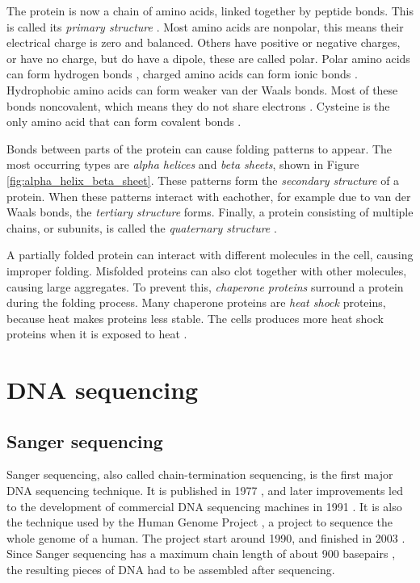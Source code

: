 \documentclass[../main/thesis.tex]{subfiles}
\begin{document}
The protein is now a chain of amino acids, linked together by peptide bonds.
This is called its \textit{primary structure} \cite{protein_structures}.
Most amino acids are nonpolar, this means their electrical charge is zero and balanced.
Others have positive or negative charges, or have no charge, but do have a dipole, these are called polar.
Polar amino acids can form hydrogen bonds \cite{hydrogen_bond}, charged amino acids can form ionic bonds \cite{ionic_bond}.
Hydrophobic amino acids can form weaker van der Waals bonds.
Most of these bonds noncovalent, which means they do not share electrons \cite{ionic_bond}.
Cysteine is the only amino acid that can form covalent bonds \cite{protein_structures}.

Bonds between parts of the protein can cause folding patterns to appear.
The most occurring types are \textit{alpha helices} and \textit{beta sheets}, shown in Figure \ref{fig:alpha_helix_beta_sheet}.
These patterns form the \textit{secondary structure} of a protein.
When these patterns interact with eachother, for example due to van der Waals bonds, the \textit{tertiary structure} forms.
Finally, a protein consisting of multiple chains, or subunits, is called the \textit{quaternary structure} \cite{protein_structures}.


A partially folded protein can interact with different molecules in the cell, causing improper folding.
Misfolded proteins can also clot together with other molecules, causing large aggregates.
To prevent this, \textit{chaperone proteins} surround a protein during the folding process.
Many chaperone proteins are \textit{heat shock} proteins, because heat makes proteins less stable.
The cells produces more heat shock proteins when it is exposed to heat \cite{chaperone_protein}.


\section{DNA sequencing}



\subsection{Sanger sequencing}
Sanger sequencing, also called chain-termination sequencing, is the first major DNA sequencing technique.
It is published in 1977 \cite{Sanger}, and later improvements led to the development of commercial DNA sequencing machines in 1991 \cite{sequencing_history}.
It is also the technique used by the Human Genome Project \cite{sanger_sequencing2}, a project to sequence the whole genome of a human.
The project start around 1990, and finished in 2003 \cite{human_genome_project}.
Since Sanger sequencing has a maximum chain length of about 900 basepairs \cite{sanger_sequencing2}, the resulting pieces of DNA had to be assembled after sequencing.
\end{document}
